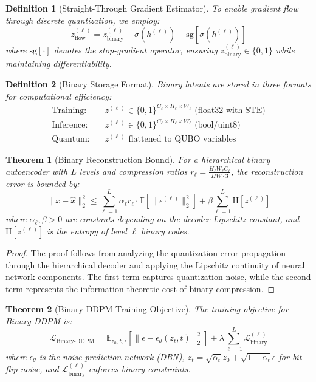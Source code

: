 \documentclass{article}
\newtheorem{theorem}{Theorem}
\newtheorem{definition}{Definition}
\begin{document}
\begin{definition}[Straight-Through Gradient Estimator]
To enable gradient flow through discrete quantization, we employ:
\begin{equation}
z^{(\ell)}_{\text{flow}} = z^{(\ell)}_{\text{binary}} + \sigma(h^{(\ell)}) - \text{sg}[\sigma(h^{(\ell)})]
\end{equation}
where $\text{sg}[\cdot]$ denotes the stop-gradient operator, ensuring $z^{(\ell)}_{\text{binary}} \in \{0,1\}$ while maintaining differentiability.
\end{definition}

\begin{definition}[Binary Storage Format]
Binary latents are stored in three formats for computational efficiency:
\begin{align}
\text{Training:} \quad &z^{(\ell)} \in \{0,1\}^{C_\ell \times H_\ell \times W_\ell} \text{ (float32 with STE)}\\
\text{Inference:} \quad &z^{(\ell)} \in \{0,1\}^{C_\ell \times H_\ell \times W_\ell} \text{ (bool/uint8)}\\
\text{Quantum:} \quad &z^{(\ell)} \text{ flattened to QUBO variables}
\end{align}
\end{definition}

\begin{theorem}[Binary Reconstruction Bound]
For a hierarchical binary autoencoder with $L$ levels and compression ratios $r_\ell = \frac{H_\ell W_\ell C_\ell}{H W \cdot 3}$, the reconstruction error is bounded by:
\begin{equation}
\|x - \hat{x}\|_2^2 \leq \sum_{\ell=1}^L \alpha_\ell r_\ell \cdot \mathbb{E}[\|\epsilon^{(\ell)}\|_2^2] + \beta \sum_{\ell=1}^L \text{H}[z^{(\ell)}]
\end{equation}
where $\alpha_\ell, \beta > 0$ are constants depending on the decoder Lipschitz constant, and $\text{H}[z^{(\ell)}]$ is the entropy of level $\ell$ binary codes.
\end{theorem}

\begin{proof}
The proof follows from analyzing the quantization error propagation through the hierarchical decoder and applying the Lipschitz continuity of neural network components. The first term captures quantization noise, while the second term represents the information-theoretic cost of binary compression.
\end{proof}

\begin{theorem}[Binary DDPM Training Objective]
The training objective for Binary DDPM is:
\begin{equation}
\mathcal{L}_{\text{Binary-DDPM}} = \mathbb{E}_{z_0, t, \epsilon}\left[\|\epsilon - \epsilon_\theta(z_t, t)\|_2^2\right] + \lambda \sum_{\ell=1}^L \mathcal{L}_{\text{binary}}^{(\ell)}
\end{equation}
where $\epsilon_\theta$ is the noise prediction network (DBN), $z_t = \sqrt{\bar{\alpha}_t} z_0 + \sqrt{1-\bar{\alpha}_t} \epsilon$ for bit-flip noise, and $\mathcal{L}_{\text{binary}}^{(\ell)}$ enforces binary constraints.
\end{theorem}
\end{document}
